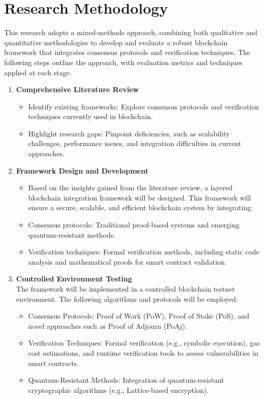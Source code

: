 \documentclass[a4paper, 12pt]{article}
\begin{document}
\section{Research Methodology}
This research adopts a mixed-methods approach, combining both qualitative and quantitative methodologies to develop and evaluate a robust blockchain framework that integrates consensus protocols and verification techniques. The following steps outline the approach, with evaluation metrics and techniques applied at each stage.
\begin{enumerate}
    \item \textbf{Comprehensive Literature Review}
\begin{itemize}
    \item Identify existing frameworks: Explore consensus protocols and verification techniques currently used in blockchain.
    \item Highlight research gaps: Pinpoint deficiencies, such as scalability challenges, performance issues, and integration difficulties in current approaches.
\end{itemize}

    \item \textbf{Framework Design and Development}
\begin{itemize}
    \item Based on the insights gained from the literature review, a layered blockchain integration framework will be designed. This framework will ensure a secure, scalable, and efficient blockchain system by integrating:
     \item Consensus protocols: Traditional proof-based systems and emerging quantum-resistant methods.
      \item Verification techniques: Formal verification methods, including static code analysis and mathematical proofs for smart contract validation.
\end{itemize}

\item \textbf{Controlled Environment Testing}
\\
The framework will be implemented in a controlled blockchain testnet environment. The following algorithms and protocols will be employed:
\begin{itemize}
    \item Consensus Protocols: Proof of Work (PoW), Proof of Stake (PoS), and novel approaches such as Proof of Adjourn (PoAj).
    \item Verification Techniques: Formal verification (e.g., symbolic execution), gas cost estimations, and runtime verification tools to assess vulnerabilities in smart contracts.
    \item Quantum-Resistant Methods: Integration of quantum-resistant cryptographic algorithms (e.g., Lattice-based encryption).
\end{itemize}


\end{enumerate}
\end{document}
